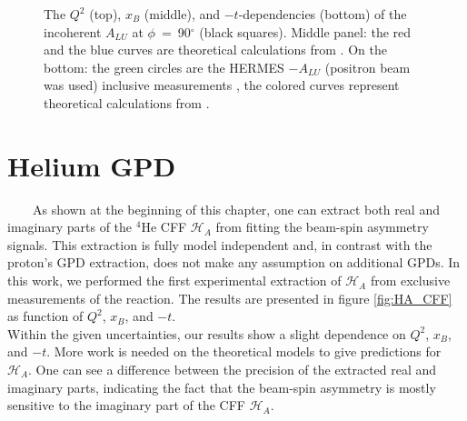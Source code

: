 \begin{figure}[tpb]
\caption{The $Q^{2}$ (top), $x_{B}$ (middle), and $-t$-dependencies (bottom) of 
   the incoherent $A_{LU}$ at $\phi$~=~90$^{\circ}$ (black squares). Middle 
   panel: the red and the blue curves are theoretical calculations from 
   \cite{simonetta_2}. On the bottom: the green circles are the HERMES 
$-A_{LU}$ (positron beam was used) inclusive measurements \cite{HERMES_BSA}, 
the colored curves represent theoretical calculations from \cite{simonetta_2}.  
} \label{fig:incoh_Q2_xB_t_ALU}
\end{figure}


\section{Helium GPD}
~~~~As shown at the beginning of this chapter, one can extract both real and
imaginary parts of the 
$^4$He CFF $\mathcal{H}_A$ from fitting the beam-spin asymmetry signals. This extraction
is fully model independent and, in contrast with the proton's GPD extraction, does not
make any assumption on additional GPDs. In this 
work, we performed the first experimental extraction of $\mathcal{H}_A$ from 
exclusive measurements of the reaction. The results are presented in figure 
\ref{fig:HA_CFF} as function of $Q^{2}$, $x_B$, and $-t$.\\

Within the given uncertainties, our results show a slight dependence on 
$Q^{2}$, $x_B$, and $-t$.  More work is needed on the theoretical models to 
give predictions for $\mathcal{H}_A$.  One can see a difference between the 
precision of the extracted real and imaginary parts, indicating the fact that 
the beam-spin asymmetry is mostly sensitive to the imaginary part of the  CFF 
$\mathcal{H}_A$.

